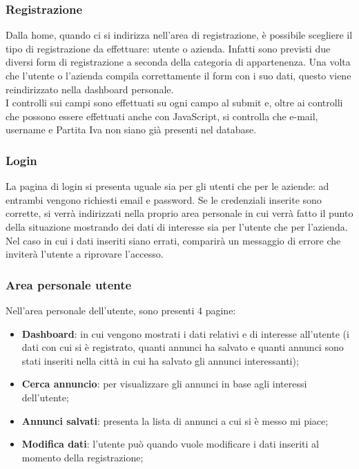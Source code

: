 		\subsubsection{Registrazione}
		Dalla home, quando ci si indirizza nell'area di registrazione, è possibile scegliere il tipo di registrazione da effettuare: utente o azienda. Infatti sono previsti due diversi form di registrazione a seconda della categoria di appartenenza. Una volta che l'utente o l'azienda compila correttamente il form con i suo dati, questo viene reindirizzato nella dashboard personale.\\
		I controlli sui campi sono effettuati su ogni campo al submit e, oltre ai controlli che possono essere effettuati anche con JavaScript, si controlla che e-mail, username e Partita Iva non siano già presenti nel database.
		\subsubsection{Login}
		La pagina di login si presenta uguale sia per gli utenti che per le aziende: ad entrambi vengono richiesti email e password. Se le credenziali inserite sono corrette, si verrà indirizzati nella proprio area personale in cui verrà fatto il punto della situazione mostrando dei dati di interesse sia per l'utente che per l'azienda. Nel caso in cui i dati inseriti siano errati, comparirà un messaggio di errore che inviterà l'utente a riprovare l'accesso.
		\subsubsection{Area personale utente}
		Nell'area personale dell'utente, sono presenti 4 pagine:
		\begin{itemize}
			\item \textbf{Dashboard}: in cui vengono mostrati i dati relativi e di interesse all'utente (i dati con cui si è registrato, quanti annunci ha salvato e quanti annunci sono stati inseriti nella città in cui ha salvato gli annunci interessanti);
			\item \textbf{Cerca annuncio}: per visualizzare gli annunci in base agli interessi dell'utente;
			\item \textbf{Annunci salvati}: presenta la lista di annunci a cui si è messo mi piace;
			\item \textbf{Modifica dati}: l'utente può quando vuole modificare i dati inseriti al momento della registrazione; 
		\end{itemize}

